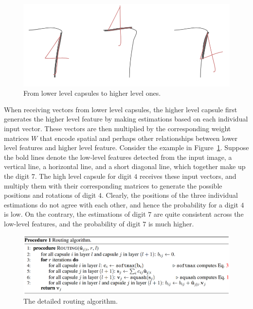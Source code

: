 \documentclass{article}
\begin{document}
\begin{figure}[!htb]
	\centering\includegraphics[width=.8\textwidth]{fig//routing}
	\caption{From lower level capsules to higher level ones.}\label{fig:routing}
\end{figure}

When receiving vectors from lower level capsules, the higher level capsule first generates the higher level feature by making estimations based on each individual input vector. These vectors are then multiplied by the corresponding weight matrices $W$ that encode spatial and perhaps other relationships between lower level features and higher level feature. Consider the example in Figure~\ref{fig:routing}. Suppose the bold lines denote the low-level features detected from the input image, a vertical line, a horizontal line, and a short diagonal line, which together make up the digit $7$. The high level capsule for digit $4$ receives these input vectors, and multiply them with their corresponding matrices to generate the possible positions and rotations of digit $4$. Clearly, the positions of the three individual estimations do not agree with each other, and hence the probability for a digit $4$ is low. On the contrary, the estimations of digit $7$ are quite consistent across the low-level features, and the probability of digit $7$ is much higher. 

\begin{figure}[!htb]
	\centering\includegraphics[width=\textwidth]{fig//algorithm}
	\caption{The detailed routing algorithm.}\label{fig:algorithm}
\end{figure}
\end{document}
